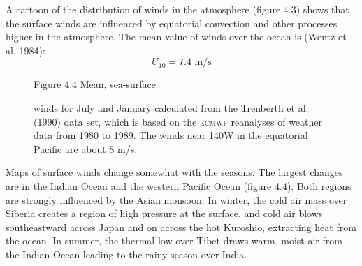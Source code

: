 A cartoon of the distribution of winds in the atmosphere (figure 4.3)
shows that the surface winds are influenced by equatorial convection
and other processes higher in the atmosphere. The mean value
of winds over the ocean is (Wentz et al. 1984):
\begin{equation}
U_{10} = 7.4 \text{ m/s}
\end{equation}

\begin{figure}[b!]
\vspace{-1ex}
{}
\footnotesize
Figure 4.4 Mean, sea-surface \rule{0pt}{3ex}winds for July and January
calculated from the Trenberth et al. (1990) data set, which is based
on the \textsc{ecmwf} reanalyses of weather data from 1980 to
1989. The winds near 140\degrees W in the equatorial Pacific are about 8 m/s.
\label{fig:seasonalwinds}
\end{figure}

Maps of surface winds change somewhat with the seasons. The largest
changes are in the Indian Ocean and the western Pacific Ocean (figure
4.4). Both regions are strongly influenced by the Asian monsoon. In
winter, the cold air mass over Siberia creates a region of high
pressure at the surface, and cold air blows southeastward across Japan
and on across the hot Kuroshio, extracting heat from
the ocean. In summer, the thermal low over Tibet draws warm, moist air
from the Indian Ocean leading to the rainy season over India.

